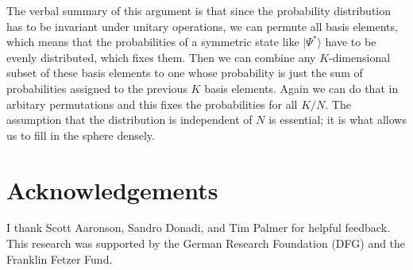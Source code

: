 \documentclass[12pt]{article}
\begin{document}
The verbal summary of this argument is that since the probability distribution has to be invariant under unitary operations, we can permute all basis elements, which means that the probabilities of a symmetric state like $|\Psi^*\rangle$ have to be evenly distributed, which fixes them. Then we can combine any $K$-dimensional subset of these basis elements to one whose probability is just the sum of probabilities assigned to the previous $K$ basis elements. Again we can do that in arbitary permutations and this fixes the probabilities for all $K/N$. The assumption that the distribution is independent of $N$ is essential; it is what allows us to fill in the sphere densely. 

\section*{Acknowledgements}

I thank Scott Aaronson, Sandro Donadi, and Tim Palmer for helpful feedback. This research was supported by the German Research Foundation (DFG) and the Franklin Fetzer Fund. 
\end{document}
